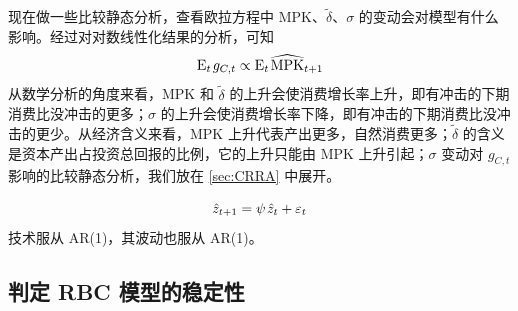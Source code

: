 现在做一些比较静态分析，查看欧拉方程中 MPK、\(\tilde\delta\)、\(\sigma\) 的变动会对模型有什么影响。经过对对数线性化结果的分析，可知
\begin{equation*}
    \mean_t\,g_{C,t}\propto \mean_t\,\widehat{\n{MPK}}\nt
\end{equation*}
从数学分析的角度来看，MPK 和 \(\tilde\delta\) 的上升会使消费增长率上升，即有冲击的下期消费比没冲击的更多；\(\sigma\) 的上升会使消费增长率下降，即有冲击的下期消费比没冲击的更少。从经济含义来看，MPK 上升代表产出更多，自然消费更多；\(\tilde\delta\) 的含义是资本产出占投资总回报的比例，它的上升只能由 MPK 上升引起；\(\sigma\) 变动对 \(g_{C,t}\) 影响的比较静态分析，我们放在 \ref{sec:CRRA} 中展开。

\begin{equation}
    \hat z\nt=\psi\,\hat z_t+\varepsilon_{t}
\end{equation}
技术服从 AR(1)，其波动也服从 AR(1)。

\subsection{判定 RBC 模型的稳定性}\label{subsec:RBCStable}

